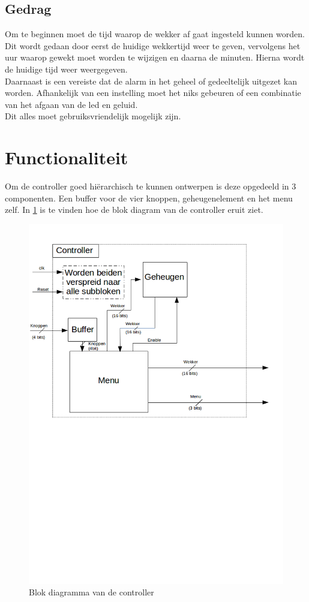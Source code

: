 \subsection{Gedrag}
Om te beginnen moet de tijd waarop de wekker af gaat ingesteld kunnen worden. Dit wordt gedaan door eerst de huidige wekkertijd weer te geven, vervolgens het uur waarop gewekt moet worden te wijzigen en daarna de minuten. Hierna wordt de huidige tijd weer weergegeven. \\
Daarnaast is een vereiste dat de alarm in het geheel of gedeeltelijk uitgezet kan worden. Afhankelijk van een instelling moet het niks gebeuren of een combinatie van het afgaan van de led en geluid.\\
Dit alles moet gebruiksvriendelijk mogelijk zijn.

\section{Functionaliteit}

Om de controller goed hi\"{e}rarchisch te kunnen ontwerpen is deze opgedeeld in 3 componenten.
Een buffer voor de vier knoppen, geheugenelement en het menu zelf. In \cref{fig:blk_controller} is te vinden hoe de blok diagram van de controller eruit ziet.

\begin{figure}
\includegraphics[width=\textwidth,height=\textheight,keepaspectratio]{Figuren/Controller/blok_controller.png}
\caption{Blok diagramma van de controller}
\label{fig:blk_controller}
\end{figure}

